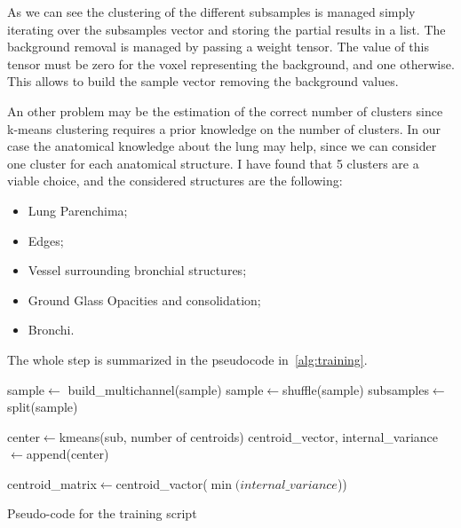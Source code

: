 		As we can see the clustering of the different subsamples is managed simply iterating over the subsamples vector and storing the partial results in a list. The background removal is managed by passing a weight tensor. The value of this tensor must be zero for the voxel representing the background, and one otherwise. This allows to build the sample vector removing the background values.
			
		An other problem may be the estimation of the correct number of clusters since k-means clustering requires a prior knowledge on the number of clusters. In our case the anatomical knowledge about the lung may help, since we can consider one cluster for each anatomical structure. I have found that 5 clusters are a viable choice, and the considered structures are the following: 
		\begin{itemize}
		
			\item Lung Parenchima;
		
			\item Edges;
		
			\item Vessel surrounding bronchial structures;
			
			\item Ground Glass Opacities and consolidation;
		
			\item Bronchi.

		\end{itemize}

	
	The whole step is summarized in the pseudocode in \figurename\,\ref{alg:training}.
		
		
	\begin{algorithm}
	
	\SetAlgoLined
	\DontPrintSemicolon
	
	\;
	
	\;
	sample$\leftarrow$ build\_multichannel(sample)\;
	sample$\leftarrow$shuffle(sample)\;
	subsamples$\leftarrow$split(sample)\;
	
	{
		center$\leftarrow$kmeans(sub, number of centroids)\;
		centroid\_vector, internal\_variance$\leftarrow$append(center)
		
	}\;

	centroid\_matrix$\leftarrow$centroid\_vactor($\min(internal\_variance$))\;
	
	\caption{Pseudo-code for the training script}\label{alg:training}
	
\end{algorithm}

	
